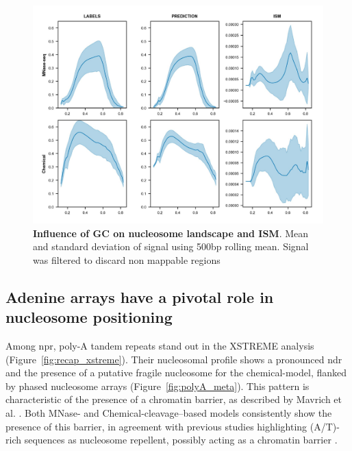 \documentclass[11pt]{book}
\begin{document}
\begin{figure}[htbp]
    \centering
    \includegraphics[width=\textwidth]{Figures/Results/GC_content_500bbinned.pdf}
    \caption{\textbf{Influence of GC on nucleosome landscape and ISM}. Mean and standard deviation of signal using 500bp rolling mean. Signal was filtered to discard non mappable regions}
    \label{fig:gc_content_500b}
\end{figure}

\subsection{Adenine arrays have a pivotal role in nucleosome positioning}
Among \gls{npr}, poly-A tandem repeats stand out in the XSTREME analysis (Figure~\ref{fig:recap_xstreme}). Their nucleosomal profile shows a pronounced \gls{ndr} and the presence of a putative fragile nucleosome for the chemical-model, flanked by phased nucleosome arrays (Figure~\ref{fig:polyA_meta}). This pattern is characteristic of the presence of a chromatin barrier, as described by Mavrich et al. \cite{mavrich_barrier_2008}. Both MNase- and Chemical-cleavage–based models consistently show the presence of this barrier, in agreement with previous studies highlighting (A/T)-rich sequences as nucleosome repellent, possibly acting as a chromatin barrier \cite{segal_genomic_2006,mavrich_barrier_2008,zhao_gaa_2015}.
\end{document}
